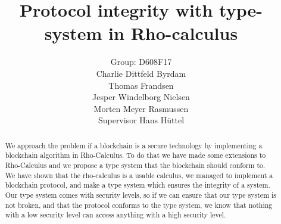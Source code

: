 \mainmatter  %

\title{Protocol integrity with type-system in Rho-calculus}




\author{Group: D608F17\\Charlie Dittfeld Byrdam\\Thomas Frandsen\\Jesper Windelborg Nielsen\\Morten Meyer Rasmussen\\Supervisor Hans Hüttel}




\toctitle{}
\tocauthor{}
\maketitle
\begin{abstract}
We approach the problem if a blockchain is a secure technology by implementing a blockchain algorithm in Rho-Calculus. To do that we have made some extensions to Rho-Calculus and we propose a type system that the blockchain should conform to. We have shown that the rho-calculus is a usable calculus, we managed to implement a blockchain protocol, and make a type system which ensures the integrity of a system. Our type system comes with security levels, so if we can ensure that our type system is not broken, and that the protocol conforms to the type system, we know that nothing with a low security level can access anything with a high security level.
\end{abstract}
\clearpage
